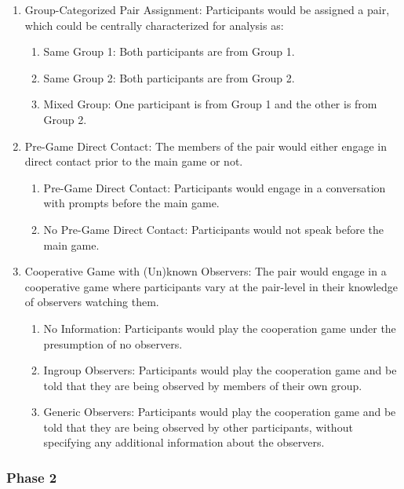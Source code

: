 \documentclass[10pt]{article}
\begin{document}
\begin{enumerate}
    \item Group-Categorized Pair Assignment: Participants would be assigned a pair, which could be centrally 
        characterized for analysis as:
        \begin{enumerate}[label=\roman*.]
            \item Same Group 1: Both participants are from Group 1.
            \item Same Group 2: Both participants are from Group 2.
            \item Mixed Group: One participant is from Group 1 and the other is from Group 2.
        \end{enumerate}
    \item Pre-Game Direct Contact: The members of the pair would either 
        engage in direct contact prior to the main game or not.
        \begin{enumerate}[label=\roman*.]
            \item Pre-Game Direct Contact: Participants would engage in a conversation with prompts before the main game.
            \item No Pre-Game Direct Contact: Participants would not speak before the main game.
        \end{enumerate}
    \item Cooperative Game with (Un)known Observers: 
        The pair would engage in a cooperative game
        where participants vary at the pair-level in their knowledge of observers watching them.
        \begin{enumerate}[label=\roman*.]
            \item No Information: Participants would play the cooperation game 
                under the presumption of no observers.
            \item Ingroup Observers: Participants would play the cooperation game 
                and be told that they are being observed by members of their own group.
            \item Generic Observers: Participants would play the cooperation game 
                and be told that they are being observed by other participants, 
                without specifying any additional information about the observers.
        \end{enumerate}
\end{enumerate}

\subsubsection{Phase 2}
\end{document}
